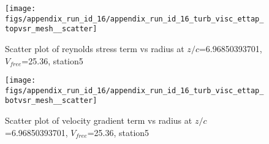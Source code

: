 \begin{figure}[H]
\centering
\texttt{[image: figs/appendix\_run\_id\_16/appendix\_run\_id\_16\_turb\_visc\_ettap\_topvsr\_mesh\_\_scatter]}
\caption{Scatter plot of reynolds stress term vs radius at $z/c$=6.96850393701, $V_{free}$=25.36, station5}
\label{fig:appendix_run_id_16_turb_visc_ettap_topvsr_mesh__scatter}
\end{figure}


\begin{figure}[H]
\centering
\texttt{[image: figs/appendix\_run\_id\_16/appendix\_run\_id\_16\_turb\_visc\_ettap\_botvsr\_mesh\_\_scatter]}
\caption{Scatter plot of velocity gradient term vs radius at $z/c$=6.96850393701, $V_{free}$=25.36, station5}
\label{fig:appendix_run_id_16_turb_visc_ettap_botvsr_mesh__scatter}
\end{figure}


